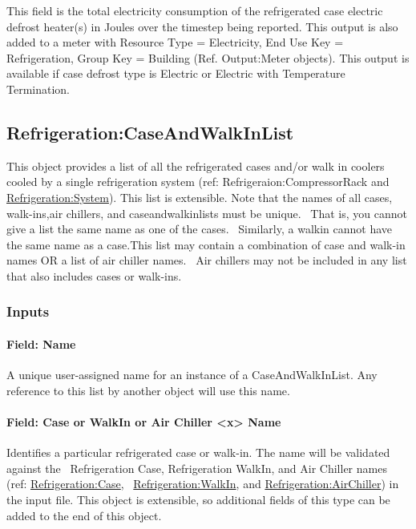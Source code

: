 This field is the total electricity consumption of the refrigerated case electric defrost heater(s) in Joules over the timestep being reported. This output is also added to a meter with Resource Type = Electricity, End Use Key = Refrigeration, Group Key = Building (Ref. Output:Meter objects). This output is available if case defrost type is Electric or Electric with Temperature Termination.

\subsection{Refrigeration:CaseAndWalkInList}\label{refrigerationcaseandwalkinlist}

This object provides a list of all the refrigerated cases and/or walk in coolers cooled by a single refrigeration system (ref: Refrigeraion:CompressorRack and \hyperref[refrigerationsystem]{Refrigeration:System}). This list is extensible. Note that the names of all cases, walk-ins,air chillers, and caseandwalkinlists must be unique.~ That is, you cannot give a list the same name as one of the cases.~ Similarly, a walkin cannot have the same name as a case.This list may contain a combination of case and walk-in names OR a list of air chiller names.~ Air chillers may not be included in any list that also includes cases or walk-ins.

\subsubsection{Inputs}\label{inputs-2-033}

\paragraph{Field: Name}\label{field-name-2-032}

A unique user-assigned name for an instance of a CaseAndWalkInList. Any reference to this list by another object will use this name.

\paragraph{Field: Case or WalkIn or Air Chiller \textless{}x\textgreater{} Name}\label{field-case-or-walkin-or-air-chiller-x-name}

Identifies a particular refrigerated case or walk-in. The name will be validated against the~ Refrigeration Case, Refrigeration WalkIn, and Air Chiller names (ref: \hyperref[refrigerationcase]{Refrigeration:Case},~ \hyperref[refrigerationwalkin]{Refrigeration:WalkIn}, and \hyperref[refrigerationairchiller]{Refrigeration:AirChiller}) in the input file. This object is extensible, so additional fields of this type can be added to the end of this object.

